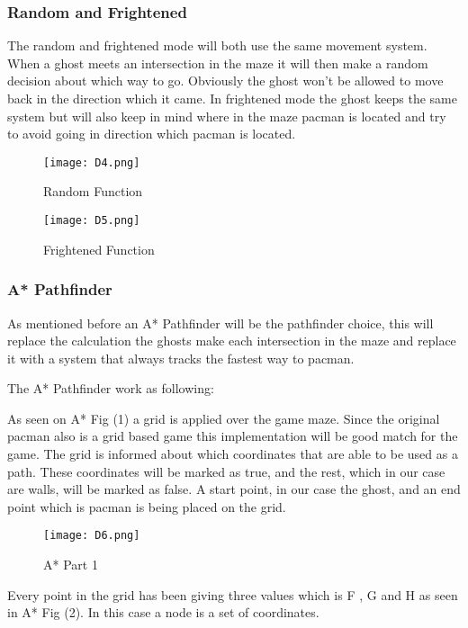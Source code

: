 \subsubsection{Random and Frightened}
The random and frightened mode will both use the same movement system. When a ghost meets an intersection in the maze it will then make a random decision about which way to go. Obviously the ghost won’t be allowed to move back in the direction which it came. In frightened mode the ghost keeps the same system but will also keep in mind where in the maze pacman is located and try to avoid going in direction which pacman is located.


\begin{figure}[!htbp]
\centering
\texttt{[image: D4.png]}
\caption{ Random Function }
\label{fig:Random}
\end{figure}

\begin{figure}[!htbp]
\centering
\texttt{[image: D5.png]}
\caption{ Frightened Function }
\label{fig:Frightened}
\end{figure}

\subsubsection{A* Pathfinder}
As mentioned before an A* Pathfinder will be the pathfinder choice, this will replace the calculation the ghosts make each intersection in the maze and replace it with a system that always tracks the fastest way to pacman.

The A* Pathfinder work as following:

As seen on A* Fig (1) a grid is applied over the game maze. Since the original pacman also is a grid based game this implementation will be good match for the game. The grid is informed about which coordinates that are able to be used as a path. These coordinates will be marked as true, and the rest, which in our case are walls, will be marked as false. A start point, in our case the ghost, and an end point which is pacman is being placed on the grid.


\begin{figure}[!htbp]
\centering
\texttt{[image: D6.png]}
\caption{ A* Part 1 }
\label{fig:A1}
\end{figure}

Every point in the grid has been giving three values which is F , G and H as seen in A* Fig (2). In this case a node is a set of coordinates.

